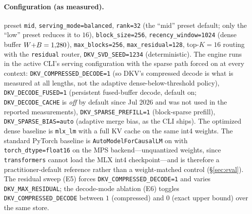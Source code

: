 \begin{sloppypar}
\paragraph{Configuration (as measured).}
preset \texttt{mid}, \texttt{serving\_mode=balanced}, \texttt{rank=32} (the ``mid'' preset
default; only the ``low'' preset reduces it to $16$), \texttt{block\_size=256},
\texttt{recency\_window=1024} (dense buffer $W{+}B=1{,}280$), \texttt{max\_blocks=256},
\texttt{max\_residual=128}, top-$K{=}16$ routing with the \texttt{residual} router,
\texttt{DKV\_SVD\_SEED=1234} (deterministic). The \dkv{} engine runs in
the active CLI's serving configuration with the sparse path forced on at every
context: \texttt{DKV\_COMPRESSED\_DECODE=1} (so DKV's compressed decode is
what is measured at all lengths, not the adaptive dense-below-threshold policy),
\texttt{DKV\_DECODE\_FUSED=1} (persistent fused-buffer decode, default on;
\texttt{DKV\_DECODE\_CACHE} is \emph{off} by default since Jul 2026 and was not
used in the reported measurements),
\texttt{DKV\_SPARSE\_PREFILL=1} (block-sparse prefill),
\texttt{DKV\_SPARSE\_BIAS=auto} (adaptive merge bias, as the CLI ships).
The optimized dense baseline is \texttt{mlx\_lm} with a full KV cache on the same
int4 weights. The standard PyTorch baseline is \texttt{AutoModelForCausalLM} on
 with \texttt{torch\_dtype=float16} on the MPS
backend---unquantized weights, since \texttt{transformers} cannot load the MLX
int4 checkpoint---and is therefore a practitioner-default reference rather than a
weight-matched control (\S\ref{sec:eval}).
The residual sweep (E5) forces \texttt{DKV\_COMPRESSED\_DECODE=1}
and varies \texttt{DKV\_MAX\_RESIDUAL}; the decode-mode ablation (E6) toggles
\texttt{DKV\_COMPRESSED\_DECODE} between $1$ (compressed) and $0$ (exact
upper bound) over the same store.
\end{sloppypar}

